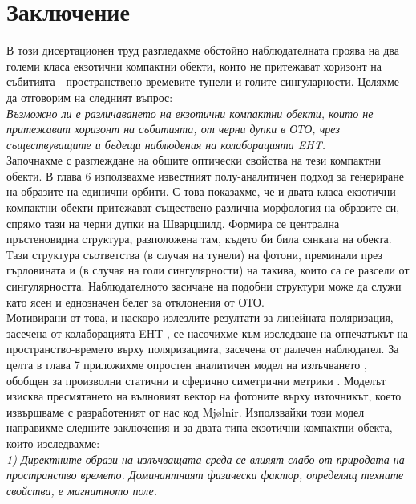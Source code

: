 \section{Заключение}

В този дисертационен труд разгледахме обстойно наблюдателната проява на два големи класа екзотични компактни обекти, които не притежават хоризонт на събитията - пространствено-времевите тунели и голите сингуларности. Целяхме да отговорим на следният въпрос:\\

\emph{Възможно ли е различаването на екзотични компактни обекти, които не притежават хоризонт на събитията, от черни дупки в ОТО, чрез съществуващите и бъдещи наблюдения на колаборацията EHT.}\\

Започнахме с разглеждане на общите оптически свойства на тези компактни обекти. В глава 6 използвахме известният полу-аналитичен подход \cite{Muller2009}\cite{Gyulchev2020}\cite{Gyulchev2021}\cite{Deliyski2022} за генериране на образите на единични орбити. С това показахме, че и двата класа екзотични компактни обекти притежават съществено различна морфология на образите си, спрямо тази на черни дупки на Шварцшилд. Формира се централна пръстеновидна структура, разположена там, където би била сянката на обекта. Тази структура съответства (в случая на тунели) на фотони, преминали през гърловината и (в случая на голи сингулярности) на такива, които са се разсели от сингулярността. Наблюдателното засичане на подобни структури може да служи като ясен и еднозначен белег за отклонения от ОТО. \\

Мотивирани от това, и наскоро излезлите резултати за линейната поляризация, засечена от колаборацията EHT \cite{EHT_M87_VII}\cite{EHT_M87_VIII}, се насочихме към изследване на отпечатъкът на пространство-времето върху поляризацията, засечена от далечен наблюдател. За целта в глава 7 приложихме опростен аналитичен модел на излъчването \cite{Narayan2021}, обобщен за произволни статични и сферично симетрични метрики \cite{Delijski2022}\cite{Deliyski2023}. Моделът изисква пресмятането на вълновият вектор на фотоните върху източникът, което извършваме с разработеният от нас код Mjølnir. Използвайки този модел направихме следните заключения и за двата типа екзотични компактни обекта, които изследвахме:\\

\emph{1) Директните образи на излъчващата среда се влияят слабо от природата на пространство времето. Доминантният физически фактор, определящ техните свойства, е магнитното поле.}\\


